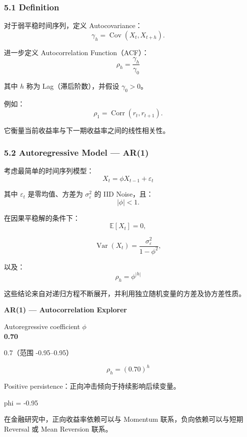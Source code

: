 \hypertarget{part-4-52-0001-definition-1}{%
\subsubsection{5.1 Definition}\label{part-4-52-0001-definition-1}}

对于弱平稳时间序列，定义 Autocovariance：
\[\gamma_h
=
\operatorname{Cov}(X_t,X_{t+h}).\]

进一步定义 Autocorrelation Function（ACF）：
\[\boxed{
\rho_h
=
\frac{\gamma_h}{\gamma_0}
}\]

其中 \(h\) 称为 Lag（滞后阶数），并假设 \(\gamma_0>0\)。

例如：
\[\rho_1
=
\operatorname{Corr}(r_t,r_{t+1}).\]

它衡量当前收益率与下一期收益率之间的线性相关性。

\hypertarget{part-4-52-0001-autoregressive-model-ar1}{%
\subsubsection{5.2 Autoregressive Model --- AR(1)}\label{part-4-52-0001-autoregressive-model-ar1}}

考虑最简单的时间序列模型：
\[\boxed{
X_t=\phi X_{t-1}+\varepsilon_t
}\]

其中 \(\varepsilon_t\) 是零均值、方差为 \(\sigma_\varepsilon^2\) 的 IID Noise，且：
\[|\phi|<1.\]

在因果平稳解的条件下：
\[\mathbb E[X_t]=0,\]

\[\operatorname{Var}(X_t)
=
\frac{\sigma_\varepsilon^2}{1-\phi^2},\]

以及：
\[\boxed{
\rho_h=\phi^{|h|}
}\]

这些结论来自对递归方程不断展开，并利用独立随机变量的方差及协方差性质。

\textbf{AR(1) --- Autocorrelation Explorer}

Autoregressive coefficient \(\phi\)\\
\textbf{0.70}

0.7（范围 -0.95--0.95）


\[\rho_h=(0.70)^h\]

Positive persistence：正向冲击倾向于持续影响后续变量。

phi = -0.95


在金融研究中，正向收益率依赖可以与 Momentum 联系，负向依赖可以与短期 Reversal 或 Mean Reversion 联系。

